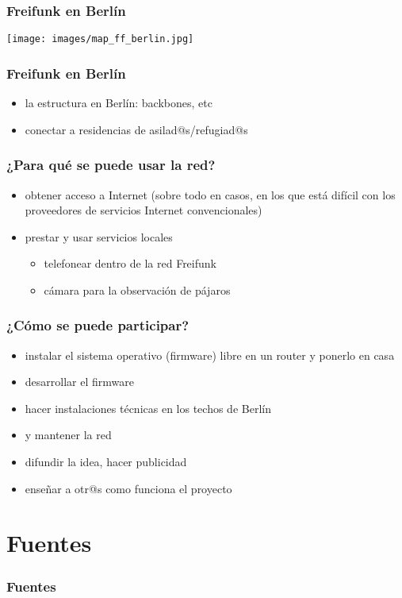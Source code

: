 \documentclass[12pt, xcolor=table]{beamer}
\begin{document}
\begin{frame}
  \frametitle{Freifunk en Berlín}
  \begin{center}
    \texttt{[image: images/map\_ff\_berlin.jpg]}
  \end{center}
\end{frame}

\begin{frame}
  \frametitle{Freifunk en Berlín}
  \begin{itemize}
    \item la estructura en Berlín: backbones, etc
    \item conectar a residencias de asilad@s/refugiad@s
  \end{itemize}
\end{frame}

\begin{frame}
  \frametitle{¿Para qué se puede usar la red?}
  \begin{itemize}
    \item obtener acceso a Internet (sobre todo en casos, en los que está difícil con los proveedores de servicios Internet convencionales)
    \item prestar y usar servicios locales
      \begin{itemize}
        \item telefonear dentro de la red Freifunk
        \item cámara para la observación de pájaros
      \end{itemize}
  \end{itemize}
\end{frame}

\begin{frame}
  \frametitle{¿Cómo se puede participar?}
  \begin{itemize}
    \item instalar el sistema operativo (firmware) libre en un router y ponerlo en casa
    \item desarrollar el firmware
    \item hacer instalaciones técnicas en los techos de Berlín
    \item y mantener la red
    \item difundir la idea, hacer publicidad
    \item enseñar a otr@s como funciona el proyecto
  \end{itemize}
\end{frame}

\section{Fuentes}
\begin{frame}
  \frametitle{Fuentes}
  \nocite{*}
  
  
\end{frame}
\end{document}
